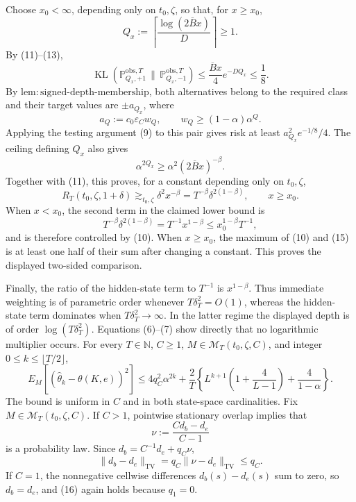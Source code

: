 Choose \(x_0<\infty\), depending only on \(t_0,\zeta\), so that, for \(x\ge x_0\),
\[
 Q_x:=\left\lceil\frac{\log(2\overline Bx)}D\right\rceil\ge1.
\]
By (11)--(13),
\[
 \operatorname{KL}(\mathbb P_{Q_x,+1}^{\mathrm{obs},T}\,\|\,
                    \mathbb P_{Q_x,-1}^{\mathrm{obs},T})
 \le\frac{\overline Bx}{4}e^{-DQ_x}\le\frac18. \tag{14}
\]
By \(\mathrm{lem{:}signed\text{-}depth\text{-}membership}\), both alternatives belong to the required class and their target values are \(\pm a_{Q_x}\), where
\[
 a_Q:=c_0\varepsilon_Cw_Q,
 \qquad
 w_Q\ge(1-\alpha)\alpha^Q.
\]
Applying the testing argument (9) to this pair gives risk at least \(a_{Q_x}^2e^{-1/8}/4\).  The ceiling defining \(Q_x\) also gives
\[
 \alpha^{2Q_x}\ge\alpha^2(2\overline Bx)^{-\beta}.
\]
Together with (11), this proves, for a constant depending only on \(t_0,\zeta\),
\[
 R_T(t_0,\zeta,1+\delta)
 \gtrsim_{t_0,\zeta}
 \delta^2x^{-\beta}
 =T^{-\beta}\delta^{2(1-\beta)},
 \qquad x\ge x_0. \tag{15}
\]
When \(x<x_0\), the second term in the claimed lower bound is
\[
 T^{-\beta}\delta^{2(1-\beta)}=T^{-1}x^{1-\beta}
 \le x_0^{1-\beta}T^{-1},
\]
and is therefore controlled by (10).  When \(x\ge x_0\), the maximum of (10) and (15) is at least one half of their sum after changing a constant.  This proves the displayed two-sided comparison.

Finally, the ratio of the hidden-state term to \(T^{-1}\) is \(x^{1-\beta}\).  Thus immediate weighting is of parametric order whenever \(T\delta_T^2=O(1)\), whereas the hidden-state term dominates when \(T\delta_T^2\to\infty\).  In the latter regime the displayed depth is of order \(\log(T\delta_T^2)\).  Equations (6)--(7) show directly that no logarithmic multiplier occurs.
For every \(T\in\mathbb N\), \(C\ge1\), \(M\in\mathcal M_T(t_0,\zeta,C)\), and integer \(0\le k\le\lfloor T/2\rfloor\),
\[
 E_M[(\widehat\theta_k-\theta(K,e))^2]
 \le4q_C^2\alpha^{2k}
 +\frac2T\left\{L^{k+1}\left(1+\frac4{L-1}\right)
 +\frac4{1-\alpha}\right\}.
\]
The bound is uniform in \(C\) and in both state-space cardinalities.
Fix \(M\in\mathcal M_T(t_0,\zeta,C)\).  If \(C>1\), pointwise stationary overlap implies that
\[
 \nu:=\frac{Cd_b-d_e}{C-1}
\]
is a probability law.  Since \(d_b=C^{-1}d_e+q_C\nu\),
\[
 \lVert d_b-d_e\rVert_{\mathrm{TV}}
 =q_C\lVert\nu-d_e\rVert_{\mathrm{TV}}
 \le q_C. \tag{16}
\]
If \(C=1\), the nonnegative cellwise differences \(d_b(s)-d_e(s)\) sum to zero, so \(d_b=d_e\), and (16) again holds because \(q_1=0\).

